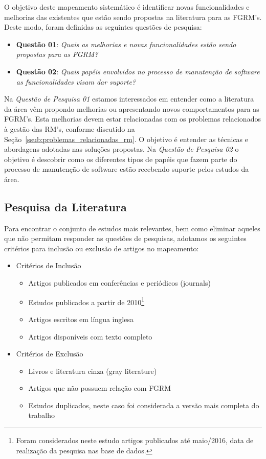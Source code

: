 O objetivo deste mapeamento sistemático é identificar novas funcionalidades e
melhorias das existentes que estão sendo propostas na literatura para as FGRM's.
Deste modo, foram definidas as seguintes questões de pesquisa:

\begin{itemize}
	\item \textbf{Questão 01}: \textit{Quais as melhorias e novas
			funcionalidades estão sendo propostas para as FGRM?}
	\item \textbf{Questão 02}: \textit{Quais papéis envolvidos no processo de
			manutenção de software as funcionalidades visam dar suporte?}
\end{itemize}

Na \textit{Questão de Pesquisa 01} estamos interessados em entender como a
literatura da área vêm propondo melhorias ou apresentando novos comportamentos
para as FGRM's. Esta melhorias devem estar relacionadas com os problemas
relacionados à gestão das RM's, conforme discutido na
Seção~\ref{ssub:problemas_relacionadas_rm}. O objetivo é entender as técnicas e
abordagens adotadas nas soluções propostas. Na \textit{Questão de Pesquisa 02} o
objetivo é descobrir como os diferentes tipos de papéis que fazem parte do
processo de manutenção de software estão recebendo suporte pelos estudos da
área.

\subsection{Pesquisa da Literatura}
\label{subsec:map-pesquisa-literatura}

Para encontrar o conjunto de estudos mais relevantes, bem como eliminar aqueles
que não permitam responder as questões de pesquisas, adotamos os seguintes
critérios para inclusão ou exclusão de artigos no mapeamento:

\begin{itemize}
	\item Critérios de Inclusão
		\begin{itemize}
			\item Artigos
				publicados em conferências e periódicos (journals)
			\item Estudos
				publicados a partir de 2010\footnote{Foram considerados neste
					estudo artigos publicados até maio/2016, data de realização
					da pesquisa nas base de dados.}
			\item Artigos escritos em
				língua inglesa
			\item Artigos disponíveis com texto
				completo
		\end{itemize}
	\item Critérios de Exclusão
		\begin{itemize}
			\item Livros e literatura cinza (gray literature)
			\item Artigos que não possuem relação com FGRM
			\item Estudos duplicados, neste caso foi considerada a versão mais
				completa do trabalho
		\end{itemize}
\end{itemize}

